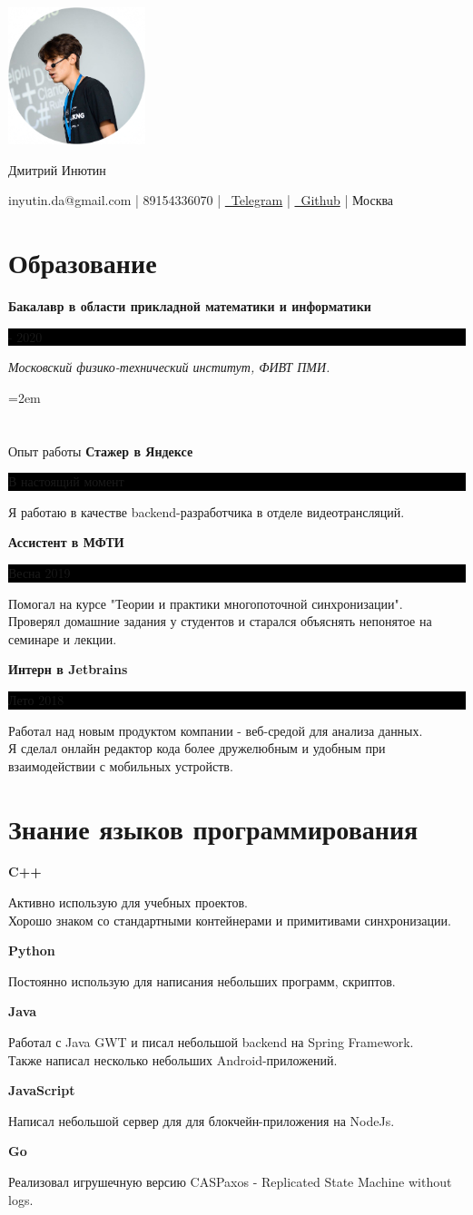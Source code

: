 \documentclass[fontsize=11pt]{article}
\newcommand{\MyName}[1]{ %
    \Huge \centering #1
    \par \normalsize \normalfont}
\newcommand{\NewPart}[1]{\section*{#1}}
\newcommand{\ProgrammingEntry}[2]{
    \noindent \textbf{#1} \hfill      %

    \noindent \small #2 %
    \normalsize \par}
\newcommand{\EducationEntry}[4]{
    \noindent \textbf{#1} \hfill      %
    \colorbox{Black}{
      \parbox{10em}{
      \color{White} \centering #2}} \par   %
    \noindent \textit{#3} \par        %
    \noindent\hangindent=2em\hangafter=0 \small #4 %
    \normalsize \par}
\newcommand{\WorkEntry}[3]{       %
    \noindent \large \textbf{#1} \hfill      %
    \colorbox{Black}{%
      \parbox{10em}{%
      \color{White} \centering #2}} \par  %
    \noindent \small #3 %
    \normalsize \par}
\begin{document}
\begin{minipage}{0.2\textwidth}%
\includegraphics[width=4cm]{me.png}
\end{minipage}%
\hfill%
\begin{minipage}{14cm}\raggedright
\bigskip
\bigskip
\bigskip
\bigskip
\bigskip
\bigskip
\MyName{Дмитрий Инютин}
\bigskip
{inyutin.da@gmail.com | 89154336070 | \href{https://t.me/inyutin}{\faTelegram \, Telegram} | \href{https://github.com/inyutin}{\faGithub \, Github} | Москва}
\end{minipage}



\NewPart{Образование}{}
\EducationEntry
{Бакалавр в области прикладной математики и информатики}
{2016 - 2020}
{Московский физико-технический институт, ФИВТ ПМИ.}

\NewPart{Опыт работы}{}
\WorkEntry
{Стажер в Яндексе}
{В настоящий момент}
{Я работаю в качестве backend-разработчика в отделе видеотрансляций.}

\bigskip

\WorkEntry
{Ассистент в МФТИ}
{Весна 2019}
{Помогал на курсе "Теории и практики многопоточной синхронизации". \\ Проверял домашние задания у студентов и старался объяснять непонятое на семинаре и лекции.}

\bigskip

\WorkEntry
{Интерн в Jetbrains}
{Лето 2018}
{Работал над новым продуктом компании - веб-средой для анализа данных. \\ Я сделал онлайн редактор кода более дружелюбным и удобным при взаимодействии с мобильных устройств.}

\NewPart{Знание языков программирования}{}
\ProgrammingEntry
{C++ \bigstar \bigstar \bigstar}
{Активно использую для учебных проектов. \\ Хорошо знаком со стандартными контейнерами и примитивами синхронизации.}
\bigskip
\ProgrammingEntry
{Python \bigstar \bigstar \bigstar}
{Постоянно использую для написания небольших программ, скриптов.}
\bigskip
\ProgrammingEntry
{Java \bigstar \bigstar}
{Работал с Java GWT и писал небольшой backend на Spring Framework. \\
Также написал несколько небольших Android-приложений.}
\bigskip
\ProgrammingEntry
{JavaScript \bigstar \bigstar}
{Написал небольшой сервер для для блокчейн-приложения на NodeJs.}
\bigskip
\ProgrammingEntry
{Go \bigstar}
{Реализовал игрушечную версию CASPaxos - Replicated State Machine without logs.}
\end{document}
